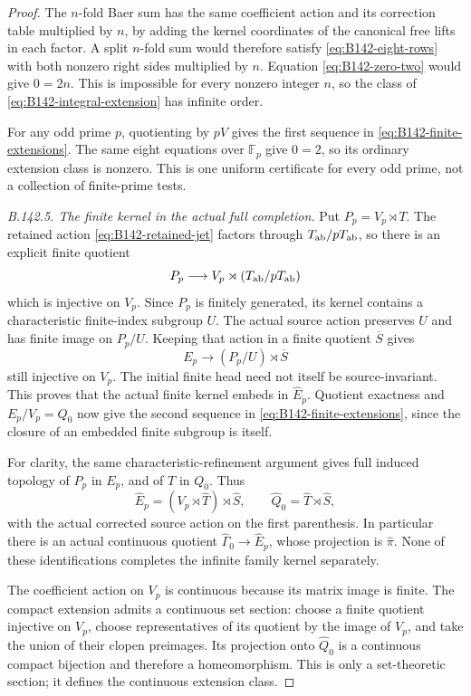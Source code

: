 \begin{proof}
The $n$-fold Baer sum has the same coefficient action and its correction
table multiplied by $n$, by adding the kernel coordinates of the
canonical free lifts in each factor. A split $n$-fold sum would therefore
satisfy \eqref{eq:B142-eight-rows} with both nonzero right sides
multiplied by $n$. Equation \eqref{eq:B142-zero-two} would give $0=2n$.
This is impossible for every nonzero integer $n$, so the class of
\eqref{eq:B142-integral-extension} has infinite order.

For any odd prime $p$, quotienting by $pV$ gives the first sequence
in \eqref{eq:B142-finite-extensions}. The same eight equations over
$\mathbb F_p$ give $0=2$, so its ordinary extension class is nonzero.
This is one uniform certificate for every odd prime, not a collection
of finite-prime tests.

\emph{B.142.5. The finite kernel in the actual full completion.}
Put $P_p=V_p\rtimes T$. The retained action
\eqref{eq:B142-retained-jet} factors through $T_{\rm ab}/pT_{\rm ab}$,
so there is an explicit finite quotient
\[
 P_p\longrightarrow V_p\rtimes(T_{\rm ab}/pT_{\rm ab})
\]
which is injective on $V_p$. Since $P_p$ is finitely generated, its
kernel contains a characteristic finite-index subgroup $U$.
The actual source action preserves $U$ and has finite image on $P_p/U$.
Keeping that action in a finite quotient $\overline S$ gives
\[
 E_p\longrightarrow(P_p/U)\rtimes\overline S
\]
still injective on $V_p$. The initial finite head need not itself be
source-invariant. This proves that the actual finite kernel embeds
in $\widehat E_p$. Quotient exactness and $E_p/V_p=Q_0$ now give
the second sequence in \eqref{eq:B142-finite-extensions}, since the
closure of an embedded finite subgroup is itself.

For clarity, the same characteristic-refinement argument gives full
induced topology of $P_p$ in $E_p$, and of $T$ in $Q_0$. Thus
\[
 \widehat E_p=(V_p\rtimes\widehat T)\rtimes\widehat S,
 \qquad \widehat Q_0=\widehat T\rtimes\widehat S,
\]
with the actual corrected source action on the first parenthesis.
In particular there is an actual continuous quotient
$\widehat\Gamma_0\to\widehat E_p$, whose projection is
$\widehat\pi$. None of these identifications completes the infinite
family kernel separately.

The coefficient action on $V_p$ is continuous because its matrix image
is finite. The compact extension admits a continuous set section:
choose a finite quotient injective on $V_p$, choose representatives
of its quotient by the image of $V_p$, and take the union of their
clopen preimages. Its projection onto $\widehat Q_0$ is a continuous
compact bijection and therefore a homeomorphism. This is only a
set-theoretic section; it defines the continuous extension class.


\end{proof}
